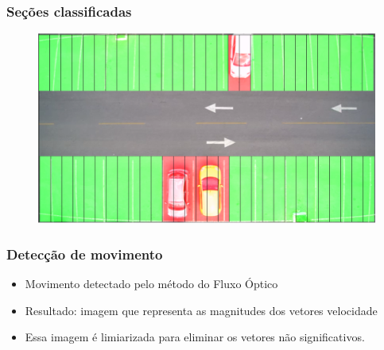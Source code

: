 \documentclass{beamer}
\begin{document}
\begin{frame}
\frametitle{Seções classificadas}
  \begin{figure}
	\centering
	\includegraphics[width=.8\textwidth]{Classificada}
	\centering
\end{figure}
\end{frame}

\begin{frame}
\frametitle{Detecção de movimento}
\begin{itemize}
\item Movimento detectado pelo método do Fluxo Óptico
\item Resultado: imagem que representa as magnitudes dos vetores velocidade
\item Essa imagem é limiarizada para eliminar os vetores não significativos.
\end{itemize}
\end{frame}
\end{document}
